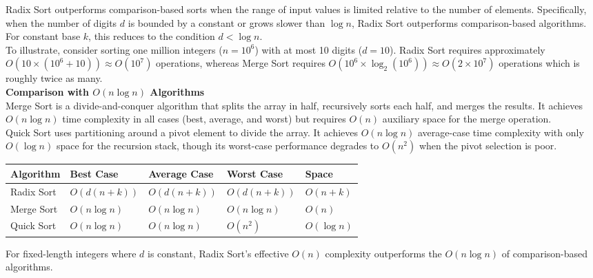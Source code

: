\documentclass[12pt]{article}
\begin{document}
Radix Sort outperforms comparison-based sorts when the range of input values is limited relative to the number of elements. Specifically, when the number of digits $d$ is bounded by a constant or grows slower than $\log n$, Radix Sort outperforms comparison-based algorithms. For constant base $k$, this reduces to the condition $d < \log n$.\\

To illustrate, consider sorting one million integers ($n = 10^6$) with at most 10 digits ($d = 10$). Radix Sort requires approximately $O(10 \times (10^6 + 10)) \approx O(10^7)$ operations, whereas Merge Sort requires $O(10^6 \times \log_2(10^6)) \approx O(2 \times 10^7)$ operations which is roughly twice as many.\\

\noindent\textbf{Comparison with $O(n \log n)$ Algorithms}\\

Merge Sort is a divide-and-conquer algorithm that splits the array in half, recursively sorts each half, and merges the results. It achieves $O(n \log n)$ time complexity in all cases (best, average, and worst) but requires $O(n)$ auxiliary space for the merge operation.\\

Quick Sort uses partitioning around a pivot element to divide the array. It achieves $O(n \log n)$ average-case time complexity with only $O(\log n)$ space for the recursion stack, though its worst-case performance degrades to $O(n^2)$ when the pivot selection is poor.

\begin{table}[h]
\centering
\begin{tabularx}{\linewidth}{@{}lXXXX@{}}
\toprule
\textbf{Algorithm} & \textbf{Best Case} & \textbf{Average Case} & \textbf{Worst Case} & \textbf{Space} \\
\midrule
Radix Sort & $O(d(n+k))$ & $O(d(n+k))$ & $O(d(n+k))$ & $O(n+k)$ \\
Merge Sort & $O(n \log n)$ & $O(n \log n)$ & $O(n \log n)$ & $O(n)$ \\
Quick Sort & $O(n \log n)$ & $O(n \log n)$ & $O(n^2)$ & $O(\log n)$ \\
\bottomrule
\end{tabularx}
\end{table}

For fixed-length integers where $d$ is constant, Radix Sort's effective $O(n)$ complexity outperforms the $O(n \log n)$ of comparison-based algorithms.\\
\end{document}
